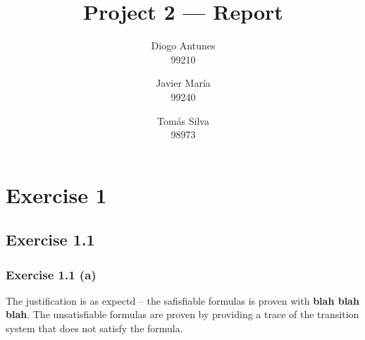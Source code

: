 \documentclass[12pt]{article}
\newcommand{\idea}[1]{\textcolor{darkyellow}{#1}}
\newcommand{\blah}{\textbf{blah blah blah}}
\begin{document}
\title{Project 2 — Report}
\author{
  Diogo Antunes\\
  99210
  \and
  Javier María\\
  99240
  \and
  Tomás Silva\\
  98973
}

\maketitle

\section*{Exercise 1}

\subsection*{Exercise 1.1}

\subsubsection*{Exercise 1.1 (a)}

\idea{The justification is as expectd -- the safisfiable formulas is proven with \blah{}.}
\idea{The unsatisfiable formulas are proven by providing a trace of the transition system that does not satisfy the formula.}
\end{document}
